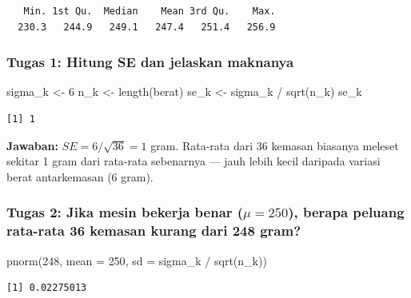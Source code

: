 \documentclass[
  indonesian,
  letterpaper,
]{book}
\newenvironment{Shaded}{\begin{snugshade}}{\end{snugshade}}
\newcommand{\AttributeTok}[1]{\textcolor[rgb]{0.40,0.45,0.13}{#1}}
\newcommand{\DecValTok}[1]{\textcolor[rgb]{0.68,0.00,0.00}{#1}}
\newcommand{\FunctionTok}[1]{\textcolor[rgb]{0.28,0.35,0.67}{#1}}
\newcommand{\NormalTok}[1]{\textcolor[rgb]{0.00,0.23,0.31}{#1}}
\newcommand{\OtherTok}[1]{\textcolor[rgb]{0.00,0.23,0.31}{#1}}
\newcommand{\SpecialCharTok}[1]{\textcolor[rgb]{0.37,0.37,0.37}{#1}}
\begin{document}
\begin{verbatim}
   Min. 1st Qu.  Median    Mean 3rd Qu.    Max. 
  230.3   244.9   249.1   247.4   251.4   256.9 
\end{verbatim}

\subsubsection{Tugas 1: Hitung SE dan jelaskan
maknanya}\label{tugas-1-hitung-se-dan-jelaskan-maknanya}

\begin{Shaded}
\begin{Highlighting}[]
\NormalTok{sigma\_k }\OtherTok{\textless{}{-}} \DecValTok{6}
\NormalTok{n\_k }\OtherTok{\textless{}{-}} \FunctionTok{length}\NormalTok{(berat)}
\NormalTok{se\_k }\OtherTok{\textless{}{-}}\NormalTok{ sigma\_k }\SpecialCharTok{/} \FunctionTok{sqrt}\NormalTok{(n\_k)}
\NormalTok{se\_k}
\end{Highlighting}
\end{Shaded}

\begin{verbatim}
[1] 1
\end{verbatim}

\textbf{Jawaban:} \(SE = 6 / \sqrt{36} = 1\) gram. Rata-rata dari 36
kemasan biasanya meleset sekitar 1 gram dari rata-rata sebenarnya ---
jauh lebih kecil daripada variasi berat antarkemasan (6 gram).

\subsubsection{\texorpdfstring{Tugas 2: Jika mesin bekerja benar
(\(\mu = 250\)), berapa peluang rata-rata 36 kemasan kurang dari 248
gram?}{Tugas 2: Jika mesin bekerja benar (\textbackslash mu = 250), berapa peluang rata-rata 36 kemasan kurang dari 248 gram?}}\label{tugas-2-jika-mesin-bekerja-benar-mu-250-berapa-peluang-rata-rata-36-kemasan-kurang-dari-248-gram}

\begin{Shaded}
\begin{Highlighting}[]
\FunctionTok{pnorm}\NormalTok{(}\DecValTok{248}\NormalTok{, }\AttributeTok{mean =} \DecValTok{250}\NormalTok{, }\AttributeTok{sd =}\NormalTok{ sigma\_k }\SpecialCharTok{/} \FunctionTok{sqrt}\NormalTok{(n\_k))}
\end{Highlighting}
\end{Shaded}

\begin{verbatim}
[1] 0.02275013
\end{verbatim}
\end{document}
